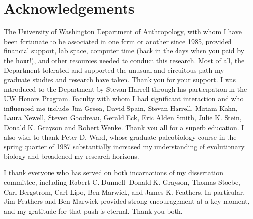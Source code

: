 





\renewcommand{\cftchapterfont}{\normalsize\normalfont}   
\renewcommand{\cftpartfont}{\normalsize\normalfont}   
\renewcommand{\cftsectionfont}{\normalsize\normalfont} 
\renewcommand{\cftsubsectionfont}{\normalsize\normalfont} 
\renewcommand*{\cftpartname}{Part\space}
\newpage
\setcounter{tocdepth}{3} 
\tableofcontents*
\cleardoublepage
\listoffigures
\cleardoublepage
\listoftables
\cleardoublepage



\clearpage
\chapter{Acknowledgements}

The University of Washington Department of Anthropology, with whom I have been fortunate to be associated in one form or another since 1985, provided financial support, lab space, computer time (back in the days when you paid by the hour!), and other resources needed to conduct this research.  Most of all, the Department tolerated and supported the unusual and circuitous path my graduate studies and research have taken.  Thank you for your support.  I was introduced to the Department by Stevan Harrell through his participation in the UW Honors Program.  Faculty with whom I had significant interaction and who influenced me include Jim Green, David Spain, Stevan Harrell, Miriam Kahn, Laura Newell, Steven Goodreau, Gerald Eck, Eric Alden Smith, Julie K. Stein, Donald K. Grayson and Robert Wenke.  Thank you all for a superb education.  I also wish to thank Peter D. Ward, whose graduate paleobiology course in the spring quarter of 1987 substantially increased my understanding of evolutionary biology and broadened my research horizons.  

\vskip 0.3cm

I thank everyone who has served on both incarnations of my dissertation committee, including Robert C. Dunnell, Donald K. Grayson, Thomas Stoebe, Carl Bergstrom, Carl Lipo, Ben Marwick, and James K. Feathers.  In particular, Jim Feathers and Ben Marwick provided strong encouragement at a key moment, and my gratitude for that push is eternal.  Thank you both.

